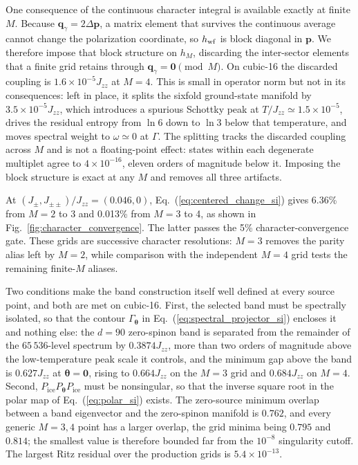 \documentclass[aps,prl,onecolumn,amsmath,amssymb]{revtex4-2}
\newcommand{\Jzz}{J_{zz}}
\newcommand{\Jpm}{J_{\pm}}
\newcommand{\Jpp}{J_{\pm\pm}}
\newcommand{\bq}{\bm q}
\newcommand{\btheta}{\bm\theta}
\newcommand{\Pice}{P_{\mathrm{ice}}}
\begin{document}
One consequence of the continuous character integral is available exactly at
finite $M$.  Because $\bq_\gamma=2\Delta\bm p$, a matrix element that survives
the continuous average cannot change the polarization coordinate, so
$h_{\rm wf}$ is block diagonal in $\bm p$.  We therefore impose that block
structure on $h_M$, discarding the inter-sector elements that a finite grid
retains through $\bq_\gamma=\bm0\pmod M$.  On cubic-16 the discarded coupling
is $1.6\times10^{-5}\Jzz$ at $M=4$.  This is small in operator norm but not in
its consequences: left in place, it splits the sixfold ground-state manifold
by $3.5\times10^{-5}\Jzz$, which introduces a spurious Schottky peak at
$T/\Jzz\simeq1.5\times10^{-5}$, drives the residual entropy from $\ln6$ down
to $\ln3$ below that temperature, and moves spectral weight to
$\omega\simeq0$ at $\Gamma$.  The splitting tracks the discarded coupling
across $M$ and is not a floating-point effect: states within each degenerate
multiplet agree to $4\times10^{-16}$, eleven orders of magnitude below it.
Imposing the block structure is exact at any $M$ and removes all three
artifacts.

At $(\Jpm,\Jpp)/\Jzz=(0.046,0)$,
Eq.~(\ref{eq:centered_change_si}) gives 6.36\% from
$M=2$ to 3 and 0.013\% from $M=3$ to 4, as shown in
Fig.~\ref{fig:character_convergence}.  The latter passes the 5\%
character-convergence gate.  These grids are successive character
resolutions: $M=3$ removes the parity alias left by $M=2$, while comparison
with the independent $M=4$ grid tests the remaining finite-$M$ aliases.

Two conditions make the band construction itself well defined at every source
point, and both are met on cubic-16.  First, the selected band must be
spectrally isolated, so that the contour $\Gamma_{\btheta}$ in
Eq.~(\ref{eq:spectral_projector_si}) encloses it and nothing else: the $d=90$
zero-spinon band is separated from the remainder of the $65\,536$-level
spectrum by $0.3874\Jzz$, more than two orders of magnitude above the
low-temperature peak scale it controls, and the minimum gap above the band is
$0.627\Jzz$ at $\btheta=\bm0$, rising to $0.664\Jzz$ on the $M=3$ grid and
$0.684\Jzz$ on $M=4$.  Second, $\Pice P_{\btheta}\Pice$ must be nonsingular,
so that the inverse square root in the polar map of
Eq.~(\ref{eq:polar_si}) exists.  The zero-source minimum overlap between a
band eigenvector and the zero-spinon manifold is $0.762$, and every generic
$M=3,4$ point has a larger overlap, the grid minima being $0.795$ and
$0.814$; the smallest value is therefore bounded far from the $10^{-8}$
singularity cutoff.  The largest Ritz residual over the production grids is
$5.4\times10^{-13}$.
\end{document}
